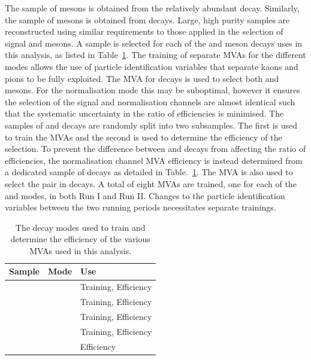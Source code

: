 The sample of \Dsp mesons is obtained from the relatively abundant \decay{\Bsb}{\Dsp\pim} decay. Similarly, the sample of \phiz mesons is obtained from \decay{\Bs}{\jpsi\phiz} decays. Large, high purity samples are reconstructed using similar requirements to those applied in the selection of signal \Dsp and \phiz mesons.
A sample is selected for each of the \Dsp and \phiz meson decays uses in this analysis, as listed in Table~\ref{tab:mva_modes}. 
The training of separate MVAs for the different \Dsp modes allows the use of particle identification variables that separate kaons and pions to be fully exploited.
The MVA for \decay{\phiz}{\Kp\Km} decays is used to select both \phiz and \Dzb mesons. For the normalisation mode this may be suboptimal, however it ensures the selection of the signal and normalisation channels are almost identical such that the systematic uncertainty in the ratio of efficiencies is minimised.
The samples of \decay{\Bsb}{\Dsp\pim} and \decay{\Bs}{\jpsi\phiz} decays are randomly split into two subsamples. The first is used to train the MVAs and the second is used to determine the efficiency of the selection. To prevent the difference between \phiz and \Dzb decays from affecting the ratio of efficiencies, the normalisation channel MVA efficiency is instead determined from a dedicated sample of \decay{\Dzb}{\Kp\Km} decays as detailed in Table.~\ref{tab:mva_modes}. The \decay{\phiz}{\Kp\Km} MVA is also used to select the \Kp\Km pair in \decay{\Bp}{\Dsp\Kp\Km} decays.
A total of eight MVAs are trained, one for each of the \Dsp and \phiz modes, in both Run I and Run II. Changes to the particle identification variables between the two running periods necessitates separate trainings. 


\begin{table}[h]
\begin{center}
\begin{tabular}{lll}
   \hline
   Sample                    & Mode                       & Use \\ 
   \hline
   \decay{\Bsb}{\Dsp\pim}    & \decay{\Dsp}{\Kp\Km\pip}   & Training, Efficiency \\
   \decay{\Bsb}{\Dsp\pim}    & \decay{\Dsp}{\Kp\pim\pip}  & Training, Efficiency \\
   \decay{\Bsb}{\Dsp\pim}    & \decay{\Dsp}{\pip\pim\pip} & Training, Efficiency \\
   \decay{\Bs}{\jpsi\phiz}   & \decay{\phiz}{\Kp\Km}      & Training, Efficiency \\
   \hline
   \decay{\Bp}{\Dzb\pip}     & \decay{\Dzb}{\Kp\Km}       & Efficiency          \\
   \hline
\end{tabular}
\end{center}
\caption{The decay modes used to train and determine the efficiency of the various MVAs used in this analysis.}
\label{tab:mva_modes}
\end{table}

